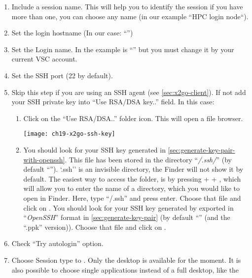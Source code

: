 \begin{enumerate}
    \item  Include a session name. This will help you to identify 
    the session if you have more than one, you can choose any name (in our example ``HPC login node``).
    \item  Set the login hostname (In our case: ``\strong{\emph{\loginnode}}'')
    \item  Set the Login name. In the example is ``\strong{\userid}'' but you must change it by your
    current VSC account.
    \item  Set the SSH port (22 by default).
    \item  Skip this step if you are using an SSH agent (see \autoref{sec:x2go-client}).
    If not add your SSH private key into ``Use RSA/DSA key..'' field. In this case:
    \begin{enumerate}
     \item Click on the ``Use RSA/DSA..'' folder icon. This will open a file browser. 
     \begin{center}
       \texttt{[image: ch19-x2go-ssh-key]}
     \end{center}
     \item
     \ifmacORlinux
     You should look for your  SSH key generated in \autoref{sec:generate-key-pair-with-openssh}.
     This file has been stored in the directory ``\emph{\tilde/.ssh/}'' (by default ``'').
     \ifmac
     `.ssh'' is an invisible directory, the Finder will
      not show it by default. The easiest way to access the folder, is by pressing
       +  + , which will allow you to enter the name of a directory, which
     you would like to open in Finder. Here, type ``\tilde/.ssh'' and press enter.
     Choose that file and click on .
     \fi
     \fi
     \ifwindows
     You should look for your  SSH key generated by  exported
     in ``\emph{OpenSSH}'' format in \autoref{sec:generate-key-pair}
     (by default ``'' (and  the ``.ppk'' version)).
     Choose that file and click on .
     \fi
    \end{enumerate}
    \item  Check ``Try autologin'' option.
    \item  Choose Session type to . Only the  desktop is available for the moment.
    It is also possible to choose single applications instead of a full desktop, like the 

\end{enumerate}
